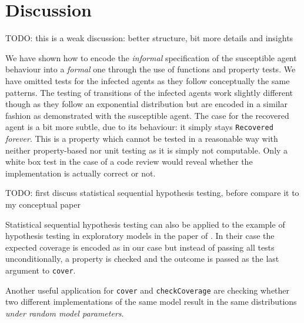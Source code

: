 \section{Discussion}
\label{sec:discussion}
TODO: this is a weak discussion: better structure, bit more details and insights

We have shown how to encode the \textit{informal} specification of the susceptible agent behaviour into a \textit{formal} one through the use of functions and property tests. We have omitted tests for the infected agents as they follow conceptually the same patterns. The testing of transitions of the infected agents work slightly different though as they follow an exponential distribution but are encoded in a similar fashion as demonstrated with the susceptible agent. The case for the recovered agent is a bit more subtle, due to its behaviour: it simply stays \texttt{Recovered} \textit{forever}. This is a property which cannot be tested in a reasonable way with neither property-based nor unit testing as it is simply not computable. Only a white box test in the case of a code review would reveal whether the implementation is actually correct or not.
 
TODO: first discuss statistical sequential hypothesis testing, before compare it to my conceptual paper 
 
Statistical sequential hypothesis testing can also be applied to the example of hypothesis testing in exploratory models in the paper of \cite{thaler_show_2019}. In their case the expected coverage is encoded as in our case but instead of passing all tests unconditionally, a property is checked and the outcome is passed as the last argument to \texttt{cover}.

Another useful application for \texttt{cover} and \texttt{checkCoverage} are checking whether two different implementations of the same model result in the same distributions \textit{under random model parameters}. 